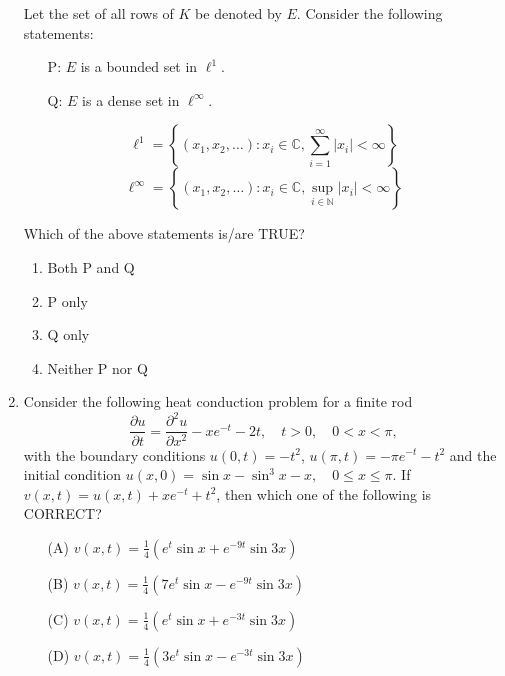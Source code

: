 \documentclass[journal]{IEEEtran}
\begin{document}
\begin{enumerate}
Let the set of all rows of \( K \) be denoted by \( E \). Consider the following statements:
\begin{itemize}
    \item[P:] \( E \) is a bounded set in \( \ell^1 \).
    \item[Q:] \( E \) is a dense set in \( \ell^{\infty} \).
\end{itemize}

\[
\ell^1 = \left\{ (x_1, x_2, \dots): x_i \in \mathbb{C}, \sum_{i=1}^{\infty} |x_i| < \infty \right\}
\]
\[
\ell^{\infty} = \left\{ (x_1, x_2, \dots): x_i \in \mathbb{C}, \sup_{i \in \mathbb{N}} |x_i| < \infty \right\}
\]

Which of the above statements is/are TRUE?

\begin{enumerate}
    \item Both P and Q
    \item P only
    \item Q only
    \item Neither P nor Q
\end{enumerate}


\vspace{0.5cm}
\item Consider the following heat conduction problem for a finite rod
\[
\frac{\partial u}{\partial t} = \frac{\partial^2 u}{\partial x^2} - xe^{-t} - 2t, \quad t > 0, \quad 0 < x < \pi,
\]
with the boundary conditions \( u(0,t) = -t^2 \), \( u(\pi,t) = -\pi e^{-t} - t^2 \) and the initial condition \( u(x,0) = \sin x - \sin^3 x - x, \quad 0 \leq x \leq \pi \). If \( v(x,t) = u(x,t) + xe^{-t} + t^2 \), then which one of the following is CORRECT?

\begin{enumerate}
    \item[(A)] \( v(x,t) = \frac{1}{4} \left( e^t \sin x + e^{-9t} \sin 3x \right) \)
    \item[(B)] \( v(x,t) = \frac{1}{4} \left( 7 e^t \sin x - e^{-9t} \sin 3x \right) \)
    \item[(C)] \( v(x,t) = \frac{1}{4} \left( e^t \sin x + e^{-3t} \sin 3x \right) \)
    \item[(D)] \( v(x,t) = \frac{1}{4} \left( 3 e^t \sin x - e^{-3t} \sin 3x \right) \)
\end{enumerate}
\end{enumerate}
\end{document}
